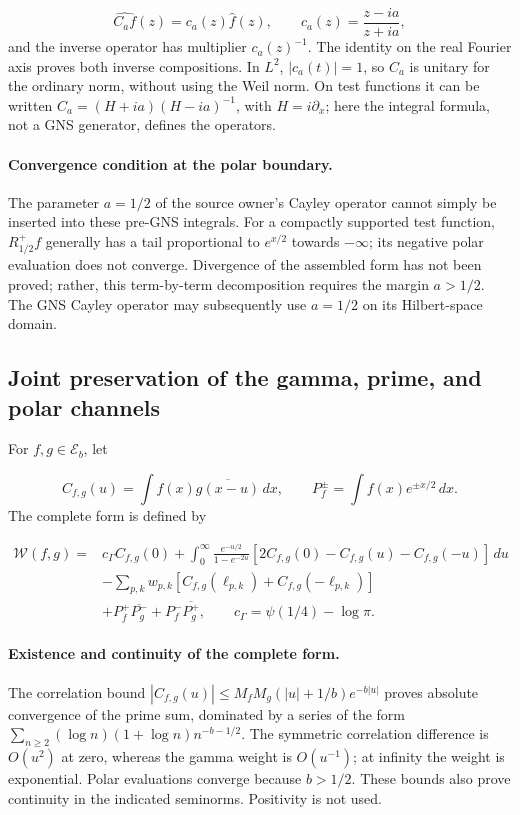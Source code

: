 \[
\widehat{C_af}(z)=c_a(z)\widehat f(z),\qquad
c_a(z)=\frac{z-ia}{z+ia},
\]
and the inverse operator has multiplier \(c_a(z)^{-1}\). The identity on the real Fourier axis proves both inverse compositions. In \(L^2\), \(|c_a(t)|=1\), so \(C_a\) is unitary for the ordinary norm, without using the Weil norm. On test functions it can be written \(C_a=(H+ia)(H-ia)^{-1}\), with \(H=i\partial_x\); here the integral formula, not a GNS generator, defines the operators.

\paragraph{Convergence condition at the polar boundary.} The parameter \(a=1/2\) of the source owner's Cayley operator cannot simply be inserted into these pre-GNS integrals. For a compactly supported test function, \(R_{1/2}^+f\) generally has a tail proportional to \(e^{x/2}\) towards \(-\infty\); its negative polar evaluation does not converge. Divergence of the assembled form has not been proved; rather, this term-by-term decomposition requires the margin \(a>1/2\). The GNS Cayley operator may subsequently use \(a=1/2\) on its Hilbert-space domain.


\subsection{Joint preservation of the gamma, prime, and polar channels}
\label{viii:tm-add-m5}
For \(f,g\in\mathscr E_b\), let

\[
C_{f,g}(u)=\int f(x)\overline{g(x-u)}\,dx,
\qquad P_f^\pm=\int f(x)e^{\pm x/2}\,dx.
\]
The complete form is defined by

\[
\begin{aligned}
\mathscr W(f,g)={}&c_\Gamma C_{f,g}(0)
+\int_0^\infty\frac{e^{-u/2}}{1-e^{-2u}}
 [2C_{f,g}(0)-C_{f,g}(u)-C_{f,g}(-u)]\,du\\
&-\sum_{p,k}w_{p,k}
 [C_{f,g}(\ell_{p,k})+C_{f,g}(-\ell_{p,k})]\\
&+P_f^+\overline{P_g^-}+P_f^-\overline{P_g^+},
\qquad c_\Gamma=\psi(1/4)-\log\pi.
\end{aligned}
\]
\paragraph{Existence and continuity of the complete form.} The correlation bound \(|C_{f,g}(u)|\le M_fM_g(|u|+1/b)e^{-b|u|}\) proves absolute convergence of the prime sum, dominated by a series of the form \(\sum_{n\ge2}(\log n)(1+\log n)n^{-b-1/2}\). The symmetric correlation difference is \(O(u^2)\) at zero, whereas the gamma weight is \(O(u^{-1})\); at infinity the weight is exponential. Polar evaluations converge because \(b>1/2\). These bounds also prove continuity in the indicated seminorms. Positivity is not used.

